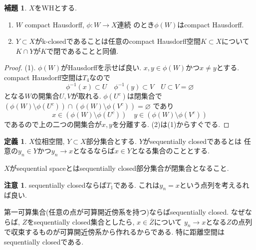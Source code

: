 \documentclass[dvipdfmx,a4paper,11pt]{article}
\theoremstyle{definition}
\newtheorem{lem}[thm]{補題}
\newtheorem{dfn}[thm]{定義}
\newtheorem{rem}[thm]{注意}
\begin{document}
 \begin{tcolorbox}
 [colback = white, colframe = green!35!black, fonttitle = \bfseries,breakable = true]
\begin{lem}\cite[Lemma 1.3]{Str}
\label{lem-weakhaus}
$X$をWHとする. 
\begin{enumerate}
\item $W$ compact Hausdorff, $\phi : W \to X$連続
のとき$\phi(W)$はcompact Hausdorff.
\item $Y \subset X$がk-closedであることは任意のcompact Hausdorff空間$K \subset X$について$K \cap Y$が$K$で閉であることと同値.
\end{enumerate}
\end{lem}
\end{tcolorbox}

\begin{proof}
(1).
$\phi(W)$がHausdorffを示せば良い.
$x,y \in \phi(W)$かつ$x \neq y$とする.
compact Hausdorff空間は$T_4$なので
$$
\phi^{-1}(x) \subset U\quad
\phi^{-1}(y) \subset V\quad
U \subset V = \varnothing
$$
となる$W$の開集合$U,V$が取れる. 
$\phi(U^{c})$は閉集合で
$\left( \phi(W) \setminus \phi(U^c) \right) \cap \left( \phi(W) \setminus \phi(V^c) \right) = \varnothing$
であり
$$
x \in \left( \phi(W) \setminus \phi(U^c) \right) \quad
y \in \left( \phi(W) \setminus \phi(V^c) \right) 
$$
であるので上の二つの開集合が$x,y$を分離する.
(2)は(1)からすぐでる.
\end{proof}

 \begin{tcolorbox}
 [colback = white, colframe = green!35!black, fonttitle = \bfseries,breakable = true]
\begin{dfn}\cite{Str}
$X$位相空間, $Y \subset X$部分集合とする.
$Y$がsequentially closedであるとは
任意の$y_n \in Y$かつ$y_n \to x$となるならば$x \in Y$となる集合のこととする.

$X$がsequential spaceとはsequentially closed部分集合が閉集合となること. 
\end{dfn}
\end{tcolorbox}
\begin{rem}
sequentially closedならば$T_1$である. これは$y_n =x$という点列を考えるれば良い. 

第一可算集合(任意の点が可算開近傍系を持つ)ならばsequentially closed.
なぜならば, $Z$をsequentially closed集合としたら, $x \in \overline{Z}$について
$y_n \to x$となる$Z$の点列で収束するものが可算開近傍系から作れるからである.
特に距離空間はsequentially closedである. 
\end{rem}
\end{document}
